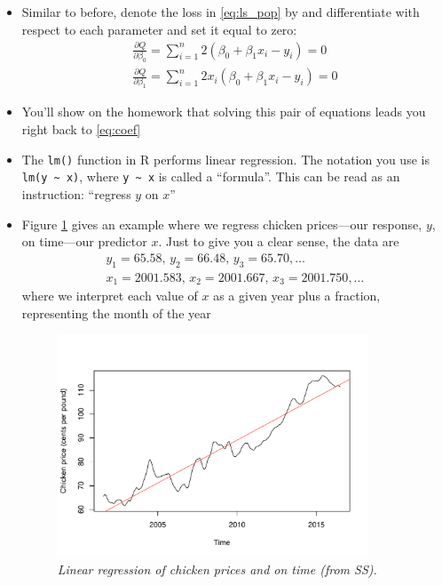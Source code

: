 \documentclass{article}
\begin{document}
\begin{itemize}
\item Similar to before, denote the loss in \eqref{eq:ls_pop} by  and differentiate with
    respect to each parameter and set it equal to zero:
  \begin{gather*}
  \frac{\partial Q}{\partial \beta_0} =  \sum_{i=1}^n 2(\beta_0 + \beta_1 x_i -
  y_i) = 0 \\ 
   \frac{\partial Q}{\partial \beta_1} = \sum_{i=1}^n  2x_i (\beta_0 + \beta_1
   x_i - y_i) = 0  
  \end{gather*}
 
\item You'll show on the homework that solving this pair of equations leads you
  right back to \eqref{eq:coef}

\item The \verb|lm()| function in R performs linear regression. The notation you
  use is \verb|lm(y ~ x)|, where \verb|y ~ x| is called a ``formula''. This can
  be read as an instruction: ``regress $y$  on $x$''    

\item Figure \ref{fig:chicken} gives an example where we regress chicken
  prices---our response, $y$, on time---our predictor $x$. Just to give you a
  clear sense, the data are
  \begin{gather*}
  y_1 = 65.58, \, y_2 = 66.48, \, y_3 = 65.70, \dots \\
  x_1 = 2001.583, \, x_2 = 2001.667, \, x_3 = 2001.750, \dots
  \end{gather*}
  where we interpret each value of $x$ as a given year plus a fraction,
  representing the month of the year 

\begin{figure}[tb]
\centering
\includegraphics[width=0.875\textwidth]{fig/chicken-1.pdf}
\caption{\it Linear regression of chicken prices and on time (from SS).} 
\label{fig:chicken}
\end{figure}
  

\end{itemize}
\end{document}
